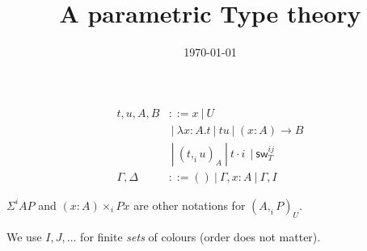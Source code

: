 \documentclass[10pt,a4paper]{article}
\title{A parametric Type theory}
\author{}
\date{\today}
\newcommand\CC[4]{(#2,_{#1} #3)_{#4}}
\newcommand\CSig[1]{\Sigma^{#1}}
\newcommand\sw[2]{\mathsf{sw}^{#1}_{#2}}
\newcommand\param[1]{\!\cdot\!#1~}
\begin{document}
\maketitle


\begin{definition}
  
  \begin{align*}
    t,u,A,B & ::= x ~|~ U \\
            & ~|~ λx:A. t      ~|~ t u ~|~ (x:A) → B \\
            & ~|~ \CC i t u A  ~|~ t \param i ~|~ \sw {ij} T \\
    \Gamma,\Delta & ::= () ~|~ \Gamma,x:A ~|~ \Gamma,I 
  \end{align*}
\end{definition}
$\CSig i A P$ and $(x:A) ×_i P x$ are other notations for $(A ,_i P)_U$.

 We use $I,J,…$ for finite {\em sets} of colours (order does not matter).
\end{document}
